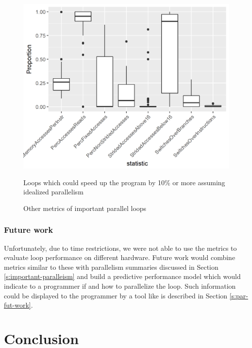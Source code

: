\documentclass[12pt,twoside]{reedthesis}
\begin{document}
		\begin{figure}
			\caption{Other metrics of important parallel loops}
			\label{fig:other-metrics}
			
			\begin{minipage}{0.6\textwidth} %
				\includegraphics[scale=0.7]{plots/stats_variablility_plot.png}
				{\footnotesize Loops which could speed up the program by 10\% or more assuming idealized parallelism \par}
			\end{minipage}
		\end{figure}
	
		\subsection{Future work}
		
		Unfortunately, due to time restrictions, we were not able to use the metrics to evaluate loop performance on different hardware. Future work would combine metrics similar to these with parallelism summaries discussed in Section \ref{s:important-paralleism} and build a predictive performance model which would indicate to a programmer if and how to parallelize the loop. Such information could be displayed to the programmer by a tool like is described in Section \ref{s:par-fut-work}.

\chapter*{Conclusion}
	\setcounter{chapter}{4}
	\setcounter{section}{0}
\end{document}
